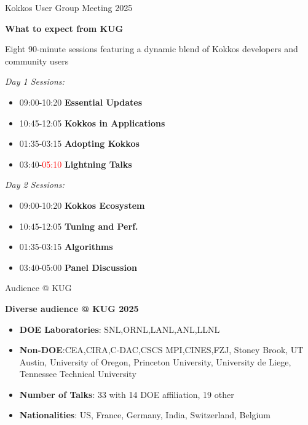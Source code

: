 
\begin{frame}[fragile]{Kokkos User Group Meeting 2025}
\begin{center}
\textbf{What to expect from KUG}
\end{center}

\begin{center}
  Eight 90-minute sessions featuring a dynamic blend of Kokkos developers and community users
\end{center}

  \begin{multicols}{2}
    \textit{Day 1 Sessions:}
      \begin{itemize}
        \item{09:00-10:20 \textbf{Essential Updates}}
        \item{10:45-12:05 \textbf{Kokkos in Applications}}
        \item{01:35-03:15 \textbf{Adopting Kokkos}}
        \item{03:40-\textcolor{red}{05:10} \textbf{Lightning Talks}}
    \end{itemize}

    \columnbreak

    \textit{Day 2 Sessions:}
      \begin{itemize}
        \item{09:00-10:20 \textbf{Kokkos Ecosystem}}
        \item{10:45-12:05 \textbf{Tuning and Perf.}}
        \item{01:35-03:15 \textbf{Algorithms}}
        \item{03:40-05:00 \textbf{Panel Discussion}}
    \end{itemize}
  \end{multicols}
\end{frame}

\begin{frame}[fragile]{Audience @ KUG}
\begin{center}
\textbf{Diverse audience @ KUG 2025}
\vspace{0.5cm}

  \begin{itemize}
    \item{\textbf{DOE Laboratories}: SNL,ORNL,LANL,ANL,LLNL}
    \item{\textbf{Non-DOE}:CEA,CIRA,C-DAC,CSCS MPI,CINES,FZJ, Stoney Brook, UT Austin, University of Oregon, Princeton University, University de Liege, Tennessee Technical University}
    \item{\textbf{Number of Talks}: 33 with 14 DOE affiliation, 19 other}
    \item{\textbf{Nationalities}: US, France, Germany, India, Switzerland, Belgium}
  \end{itemize}

\end{center}
\end{frame}

